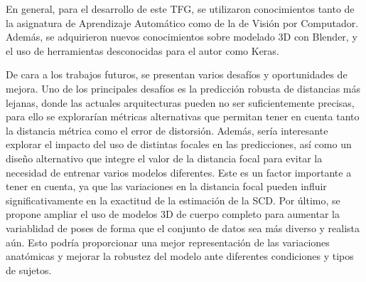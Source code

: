 En general, para el desarrollo de este TFG, se utilizaron conocimientos tanto de la asignatura de Aprendizaje Automático como de la de Visión por Computador. Además, se adquirieron nuevos conocimientos sobre modelado 3D con Blender, y el uso de herramientas desconocidas para el autor como Keras.

De cara a los trabajos futuros, se presentan varios desafíos y oportunidades de mejora. Uno de los principales desafíos es la predicción robusta de distancias más lejanas, donde las actuales arquitecturas pueden no ser suficientemente precisas, para ello se explorarían métricas alternativas que permitan tener en cuenta tanto la distancia métrica como el error de distorsión. Además, sería interesante explorar el impacto del uso de distintas focales en las predicciones, así como un diseño alternativo que integre el valor de la distancia focal para evitar la necesidad de entrenar varios modelos diferentes. Este es un factor importante a tener en cuenta, ya que las variaciones en la distancia focal pueden influir significativamente en la exactitud de la estimación de la SCD. Por último, se propone ampliar el uso de modelos 3D de cuerpo completo para aumentar la variablidad de poses de forma que el conjunto de datos sea más diverso y realista aún. Esto podría proporcionar una mejor representación de las variaciones anatómicas y mejorar la robustez del modelo ante diferentes condiciones y tipos de sujetos.

